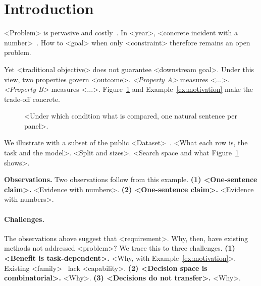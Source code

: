 \section{Introduction}
\label{sec:intro}

<Problem> is pervasive and costly~\cite{placeholder2024}. In <year>, <concrete incident with a number>~\cite{placeholder2024}. How to <goal> when only <constraint> therefore remains an open problem.

Yet <traditional objective> does not guarantee <downstream goal>. Under this view, two properties govern <outcome>. \emph{<Property A>} measures <...>. \emph{<Property B>} measures <...>. Figure~\ref{fig:motivation} and Example~\ref{ex:motivation} make the trade-off concrete.

\begin{figure}[t]
\centering
{}
\caption{<Under which condition what is compared, one natural sentence per panel>.}
\label{fig:motivation}
\end{figure}

\begin{example}
\label{ex:motivation}
We illustrate with a subset of the public <Dataset>~\cite{placeholder2024}. <What each row is, the task and the model>. <Split and sizes>. <Search space and what Figure~\ref{fig:motivation} shows>.
\end{example}

\textbf{Observations.} Two observations follow from this example.
\textbf{(1) <One-sentence claim>.} <Evidence with numbers>.
\textbf{(2) <One-sentence claim>.} <Evidence with numbers>.

\paragraph{Challenges.} The observations above suggest that <requirement>. Why, then, have existing methods not addressed <problem>? We trace this to three challenges.
\textbf{(1) <Benefit is task-dependent>.} <Why, with Example~\ref{ex:motivation}>. Existing <family>~\cite{placeholder2024} lack <capability>.
\textbf{(2) <Decision space is combinatorial>.} <Why>.
\textbf{(3) <Decisions do not transfer>.} <Why>.

